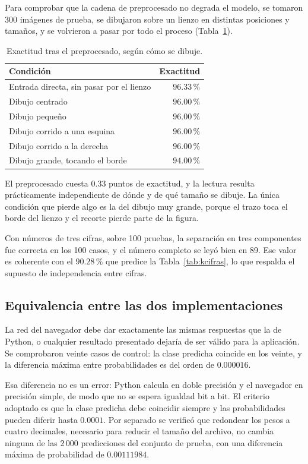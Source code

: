 \documentclass[12pt,letterpaper]{article}
\newcommand{\pc}{\,\%}
\begin{document}
Para comprobar que la cadena de preprocesado no degrada el modelo, se tomaron 300
imágenes de prueba, se dibujaron sobre un lienzo en distintas posiciones y tamaños,
y se volvieron a pasar por todo el proceso (Tabla~\ref{tab:preproceso}).

\begin{table}[htbp]
\centering
\caption{Exactitud tras el preprocesado, según cómo se dibuje.}
\label{tab:preproceso}
\begin{tabular}{lr}
\toprule
\textbf{Condición} & \textbf{Exactitud} \\
\midrule
Entrada directa, sin pasar por el lienzo & $96.33\pc$ \\
Dibujo centrado & $96.00\pc$ \\
Dibujo pequeño & $96.00\pc$ \\
Dibujo corrido a una esquina & $96.00\pc$ \\
Dibujo corrido a la derecha & $96.00\pc$ \\
Dibujo grande, tocando el borde & $94.00\pc$ \\
\bottomrule
\end{tabular}
\end{table}

El preprocesado cuesta $0.33$ puntos de exactitud, y la lectura resulta prácticamente
independiente de dónde y de qué tamaño se dibuje. La única condición que pierde algo
es la del dibujo muy grande, porque el trazo toca el borde del lienzo y el recorte
pierde parte de la figura.

Con números de tres cifras, sobre 100 pruebas, la separación en tres componentes fue
correcta en los 100 casos, y el número completo se leyó bien en 89. Ese valor es
coherente con el $90.28\pc$ que predice la Tabla~\ref{tab:kcifras}, lo que respalda
el supuesto de independencia entre cifras.

\subsection{Equivalencia entre las dos implementaciones}
\label{sec:equivalencia}

La red del navegador debe dar exactamente las mismas respuestas que la de Python, o
cualquier resultado presentado dejaría de ser válido para la aplicación. Se
comprobaron veinte casos de control: la clase predicha coincide en los veinte, y la
diferencia máxima entre probabilidades es del orden de $0.000016$.

Esa diferencia no es un error: Python calcula en doble precisión y el navegador en
precisión simple, de modo que no se espera igualdad bit a bit. El criterio adoptado
es que la clase predicha debe coincidir siempre y las probabilidades pueden diferir
hasta $0.0001$. Por separado se verificó que redondear los pesos a cuatro
decimales, necesario para reducir el tamaño del archivo, no cambia ninguna de las
2\,000 predicciones del conjunto de prueba, con una diferencia máxima de
probabilidad de $0.00111984$.
\end{document}
